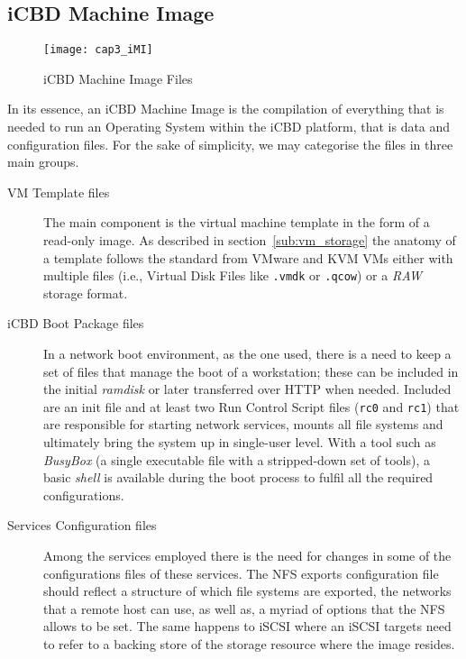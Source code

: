 \subsection{iCBD Machine Image}
\label{sub:icbd_architecture_imi}

\begin{figure}[htbp]
	\centering
	\texttt{[image: cap3\_iMI]}
	\caption{iCBD Machine Image Files}
	\label{fig:icbd_iMI_files}
\end{figure}

In its essence, an iCBD Machine Image is the compilation of everything that is needed to run an Operating System within the iCBD platform, that is data and configuration files. For the sake of simplicity, we may categorise the files in three main groups.

\begin{description}
	\item [VM Template files] The main component is the virtual machine template in the form of a read-only image. As described in section~\ref{sub:vm_storage} the anatomy of a template follows the standard from VMware and KVM VMs either with multiple files (i.e., Virtual Disk Files like \texttt{.vmdk} or \texttt{.qcow}) or a \textit{RAW} storage format.
	\item [iCBD Boot Package files] In a network boot environment, as the one used, there is a need to keep a set of files that manage the boot of a workstation; these can be included in the initial \textit{ramdisk} or later transferred over HTTP when needed. Included are an init file and at least two Run Control Script files (\texttt{rc0} and \texttt{rc1}) that are responsible for starting network services, mounts all file systems and ultimately bring the system up in single-user level. With a tool such as \textit{BusyBox} (a single executable file with a stripped-down set of tools), a basic \textit{shell} is available during the boot process to fulfil all the required configurations.
	\item [Services Configuration files] Among the services employed there is the need for changes in some of the configurations files of these services. The NFS exports configuration file should reflect a structure of which file systems are exported, the networks that a remote host can use, as well as, a myriad of options that the NFS allows to be set. The same happens to iSCSI where an iSCSI targets need to refer to a backing store of the storage resource where the image resides. 
\end{description}



